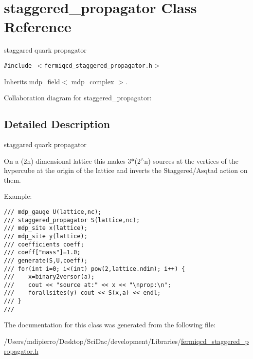 \hypertarget{classstaggered__propagator}{
\section{staggered\_\-propagator Class Reference}
\label{classstaggered__propagator}
}
staggared quark propagator  


{\tt \#include $<$fermiqcd\_\-staggered\_\-propagator.h$>$}

Inherits \hyperlink{classmdp__field}{mdp\_\-field$<$ mdp\_\-complex $>$}.

Collaboration diagram for staggered\_\-propagator:

\subsection{Detailed Description}
staggared quark propagator 

On a (2n) dimensional lattice this makes 3$\ast$(2$^\wedge$n) sources at the vertices of the hypercube at the origin of the lattice and inverts the Staggered/Asqtad action on them.

Example: 

\footnotesize\begin{verbatim}
/// mdp_gauge U(lattice,nc);
/// staggered_propagator S(lattice,nc);
/// mdp_site x(lattice);
/// mdp_site y(lattice);
/// coefficients coeff;
/// coeff["mass"]=1.0;
/// generate(S,U,coeff);
/// for(int i=0; i<(int) pow(2,lattice.ndim); i++) {
///    x=binary2versor(a);
///    cout << "source at:" << x << "\nprop:\n"; 
///    forallsites(y) cout << S(x,a) << endl;
/// }
/// \end{verbatim}
\normalsize
 

The documentation for this class was generated from the following file:\begin{CompactItemize}
\item 
/Users/mdipierro/Desktop/SciDac/development/Libraries/\hyperlink{fermiqcd__staggered__propagator_8h}{fermiqcd\_\-staggered\_\-propagator.h}\end{CompactItemize}
